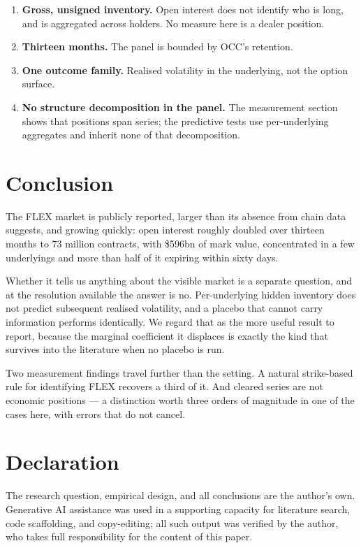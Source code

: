 \documentclass[11pt]{article}
\begin{document}
\begin{enumerate}
\item \textbf{Gross, unsigned inventory.} Open interest does not identify who is long,
and is aggregated across holders. No measure here is a dealer position.
\item \textbf{Thirteen months.} The panel is bounded by OCC's retention.
\item \textbf{One outcome family.} Realised volatility in the underlying, not the option
surface.
\item \textbf{No structure decomposition in the panel.} The measurement section shows
that positions span series; the predictive tests use per-underlying aggregates and
inherit none of that decomposition.
\end{enumerate}

\section{Conclusion}

The FLEX market is publicly reported, larger than its absence from chain data suggests,
and growing quickly: open interest roughly doubled over thirteen months to 73 million
contracts, with \$596bn of mark value, concentrated in a few underlyings and more than
half of it expiring within sixty days.

Whether it tells us anything about the visible market is a separate question, and at
the resolution available the answer is no. Per-underlying hidden inventory does not
predict subsequent realised volatility, and a placebo that cannot carry information
performs identically. We regard that as the more useful result to report, because the
marginal coefficient it displaces is exactly the kind that survives into the literature
when no placebo is run.

Two measurement findings travel further than the setting. A natural strike-based rule
for identifying FLEX recovers a third of it. And cleared series are not economic
positions --- a distinction worth three orders of magnitude in one of the cases here,
with errors that do not cancel.

\section*{Declaration}

The research question, empirical design, and all conclusions are the author's own.
Generative AI assistance was used in a supporting capacity for literature search, code
scaffolding, and copy-editing; all such output was verified by the author, who takes
full responsibility for the content of this paper.
\end{document}
